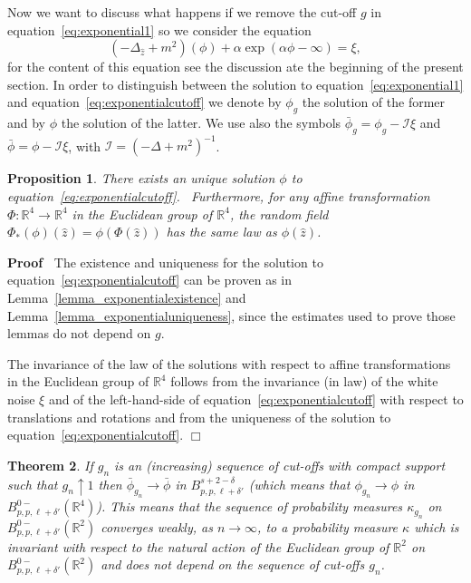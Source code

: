 \documentclass[a4paper,10pt]{article}
\newcommand{\asterisk}{\mathord{*}}
\newenvironment{proof}{\noindent\textbf{Proof\ }}{\hspace*{\fill}$\Box$\medskip}
\newtheorem{theorem}{Theorem}
\newtheorem{proposition}[theorem]{Proposition}
{\theorembodyfont{\rmfamily}\newtheorem{remark}[theorem]{Remark}}
\begin{document}
Now we want to discuss what happens if we remove the cut-off $g$ in
equation~{\eqref{eq:exponential1}} so we consider the equation
\begin{equation}
  (- \Delta_{\hat{z}} + m^2) (\phi) + \alpha \exp (\alpha \phi - \infty) =
  \xi, \label{eq:exponentialcutoff}
\end{equation}
for the content of this equation see the discussion ate the beginning of the
present section. In order to distinguish between the solution to
equation~{\eqref{eq:exponential1}} and equation~{\eqref{eq:exponentialcutoff}}
we denote by $\phi_g$ the solution of the former and by $\phi$ the solution of
the latter. We use also the symbols $\bar{\phi}_g = \phi_g - \mathcal{I} \xi$
and $\bar{\phi} = \phi - \mathcal{I} \xi$, with $\mathcal{I} = (- \Delta +
m^2)^{- 1}$.

\begin{proposition}
  \label{proposition_g1}There exists an unique solution $\phi$ to
  equation~{\eqref{eq:exponentialcutoff}}. \ Furthermore, for any affine
  transformation $\Phi : \mathbb{R}^4 \rightarrow \mathbb{R}^4$ in the
  Euclidean group of $\mathbb{R}^4$, the random field $\Phi_{\asterisk} (\phi)
  (\hat{z}) = \phi (\Phi (\hat{z}))$ has the same law as $\phi (\hat{z})$.
\end{proposition}

\begin{proof}
  The existence and uniqueness for the solution to
  equation~{\eqref{eq:exponentialcutoff}} can be proven as in
  Lemma~\ref{lemma_exponentialexistence} and
  Lemma~\ref{lemma_exponentialuniqueness}, since the estimates used to prove
  those lemmas do not depend on $g$.
  
  The invariance of the law of the solutions with respect to affine
  transformations in the Euclidean group of $\mathbb{R}^4$ follows from the
  invariance (in law) of the white noise $\xi$ and of the left-hand-side of
  equation~{\eqref{eq:exponentialcutoff}} with respect to translations and
  rotations and from the uniqueness of the solution to
  equation~{\eqref{eq:exponentialcutoff}}.
\end{proof}

\begin{theorem}
  \label{theorem_dimensionalreduction2}If $g_n$ is an (increasing) sequence of
  cut-offs with compact support such that $g_n \uparrow 1$ then
  $\bar{\phi}_{g_n} \rightarrow \bar{\phi}$ in $B^{s + 2 - \delta}_{p, p, \ell
  + \delta'}$ (which means that $\phi_{g_n} \rightarrow \phi$ in $B^{0 -}_{p,
  p, \ell + \delta'} (\mathbb{R}^4)$). This means that the sequence of
  probability measures $\kappa_{g_n}$ on $B^{0 -}_{p, p, \ell + \delta'}
  (\mathbb{R}^2)$ converges weakly, as $n \rightarrow \infty$, to a
  probability measure $\kappa$ which is invariant with respect to the natural
  action of the Euclidean group of $\mathbb{R}^2$ on $B^{0 -}_{p, p, \ell +
  \delta'} (\mathbb{R}^2)$ and does not depend on the sequence of cut-offs
  $g_n$.
\end{theorem}
\end{document}
